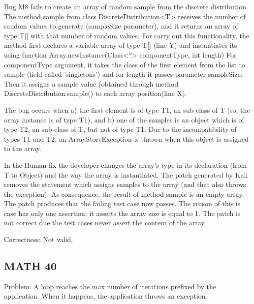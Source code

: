 \documentclass{article}
\begin{document}
    
Bug M8 fails to create an array of random sample from the discrete distribution.
The method sample from class DiscreteDistribution<T> receives the number of random values to generate (sampleSize parameter), and it returns an array of type T[] with that number of random values.
For carry out this functionality, the method first declares a variable  array of type T[] (line Y) and instantiates its using function Array.newInstance(Class<?> componentType, int length) %
For componentType argument, it takes the class of the first element from the list to sample (field called 'singletons') and for length it passes parameter sampleSize.
Then it assigns a sample  value  (obtained through method DiscreteDistribution.sample() to each array position(line X).

The bug occurs when 
a) the first element is of type T1, an sub-class of T (so, the array instance is of type T1), 
and 
b) one of the samples is an object which is of type T2, an sub-class of T, but not of type T1.
%
Due to the  incompatibility of types T1 and T2, an ArrayStoreException is thrown when this object is assigned to the array.  


In the Human fix the developer changes  the array's type in its declaration (from T to Object) and the way the array is instantiated.
The patch generated by Kali removes the statement which assigns samples to the array (and that also throws the exception).
As consequence, the result of method sample is an empty array.
The patch produces that the failing test case now passes.
The reason of this is case has only one assertion: it asserts the array size is equal to 1. 
The patch is not correct due the test cases never assert the content of the array.





Correctness: Not valid.

\subsection{MATH 40}
Problem:
A loop  reaches the max number of iterations prefixed by the application.
When it happens, the application throws an exception.
\end{document}
